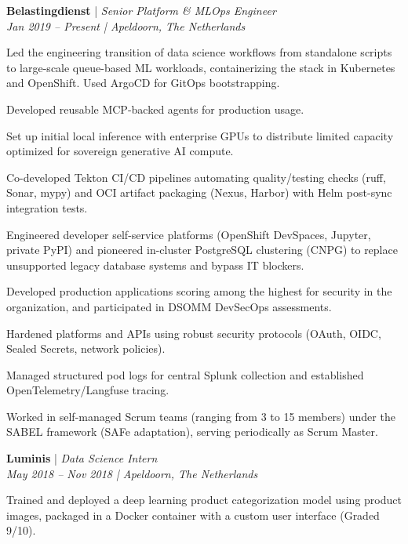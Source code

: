 \documentclass[a4paper]{deedy-resume} %
\begin{document}
\noindent \textbf{Belastingdienst} | \textit{Senior Platform \& MLOps Engineer} \\
\textit{Jan 2019 – Present | Apeldoorn, The Netherlands}
\begin{tightitemize}
\item Led the engineering transition of data science workflows from standalone scripts to large-scale queue-based ML workloads, containerizing the stack in Kubernetes and OpenShift. Used ArgoCD for GitOps bootstrapping.
\item Developed reusable MCP-backed agents for production usage.
\item Set up initial local inference with enterprise GPUs to distribute limited capacity optimized for sovereign generative AI compute.
\item Co-developed Tekton CI/CD pipelines automating quality/testing checks (ruff, Sonar, mypy) and OCI artifact packaging (Nexus, Harbor) with Helm post-sync integration tests.
\item Engineered developer self-service platforms (OpenShift DevSpaces, Jupyter, private PyPI) and pioneered in-cluster PostgreSQL clustering (CNPG) to replace unsupported legacy database systems and bypass IT blockers.
\item Developed production applications scoring among the highest for security in the organization, and participated in DSOMM DevSecOps assessments.
\item Hardened platforms and APIs using robust security protocols (OAuth, OIDC, Sealed Secrets, network policies).
\item Managed structured pod logs for central Splunk collection and established OpenTelemetry/Langfuse tracing.
\item Worked in self-managed Scrum teams (ranging from 3 to 15 members) under the SABEL framework (SAFe adaptation), serving periodically as Scrum Master.
\end{tightitemize}
\vspace{10pt}

\noindent \textbf{Luminis} | \textit{Data Science Intern} \\
\textit{May 2018 – Nov 2018 | Apeldoorn, The Netherlands}
\begin{tightitemize}
\item Trained and deployed a deep learning product categorization model using product images, packaged in a Docker container with a custom user interface (Graded 9/10).
\end{tightitemize}
\vspace{10pt}
\end{document}
